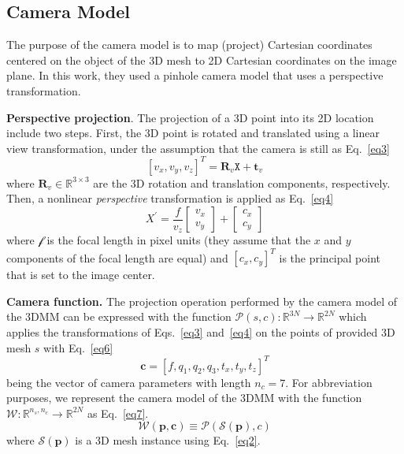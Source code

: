 \documentclass[twocolumn]{article}
\begin{document}
        \subsection{Camera Model}
        The purpose of the camera model is to map (project) Cartesian coordinates centered on the object of the 3D mesh to 2D Cartesian coordinates on the image plane. In this work, they used a pinhole camera model that uses a perspective transformation.
        \par
        \textbf{Perspective projection}. The projection of a 3D point into its 2D location include two steps. First, the 3D point is rotated and translated using a linear view transformation, under the assumption that the camera is still as Eq.~\ref{eq3}
        \begin{equation}
        \left[v_x, v_y, v_z \right]^{T} = \mathbf{R}_{v}\mathtt{X} + \mathbf{t}_v
        \label{eq3}
        \end{equation}
        where $\mathbf{R}_{v} \in \mathbb{R}^{3 \times 3}$ are the 3D rotation and translation components, respectively. Then, a nonlinear \emph{perspective} transformation is applied as Eq.~\ref{eq4}
        \begin{equation}
        X^{'}= \frac{\mathit{f}}{v_z} \begin{bmatrix} v_x \\ v_y \end{bmatrix} + \begin{bmatrix} c_x \\ c_y \end{bmatrix}
        \label{eq4}
        \end{equation}
        where $\mathcal{f}$ is the focal length in pixel units (they assume that the $x$ and $y$ components of the focal length are equal) and $\left[c_x, c_y \right]^{T}$ is the principal point that is set to the image center.
        \par
        \textbf{Camera function.} The projection operation performed by the camera model of the 3DMM can be expressed with the function $\mathcal{P} (s, c): \mathbb{R}^{3N} \to \mathbb{R}^{2N}$ which applies the transformations of Eqs.~\ref{eq3} and~\ref{eq4} on the points of provided 3D mesh $s$ with Eq.~\ref{eq6}
        \begin{equation}
        \mathbf{c} = \left[\mathit{f}, q_1, q_2, q_3, t_x, t_y, t_z\right]^{T}
        \label{eq6}
        \end{equation}
        being the vector of camera parameters with length $n_c = 7$. For abbreviation purposes, we represent the camera model of the 3DMM with the function $ \mathcal{W}: \mathbb{R}^{n_s, n_c} \to \mathbb{R}^{2N} $ as Eq.~\ref{eq7}.
        \begin{equation}
        \mathcal{W} \left(\mathbf{p}, \mathbf{c}\right) \equiv \mathcal{P} \left(\mathcal{S}(\mathbf{p}), c \right)
        \label{eq7}
        \end{equation}
        where $\mathcal{S}(\mathbf{p})$ is a 3D mesh instance using Eq.~\ref{eq2}.
\end{document}
